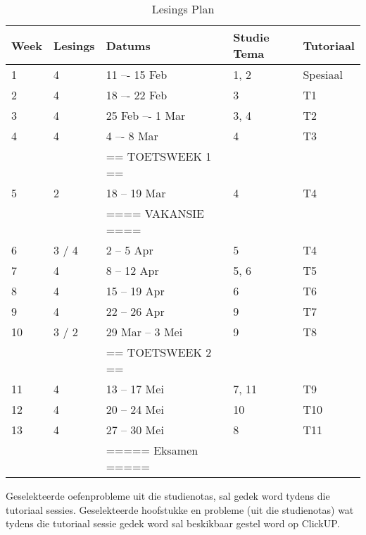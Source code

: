         \begin{table}[!h]
            \begin{center}
             \begin{tabular}{|l|l|l|l|l|}
                 \hline
                 {\bf Week} & {\bf Lesings} & {\bf Datums} & {\bf Studie Tema} & {\bf Tutoriaal} \\
                 \hline
                 1  & 4     & 11 –- 15 Feb     & 1, 2  & Spesiaal \\
                 2  & 4     & 18 –- 22 Feb     & 3     & T1 \\
                 3  & 4     & 25 Feb –- 1 Mar  & 3, 4  & T2 \\
                 4  & 4     & 4 –- 8 Mar       & 4     & T3 \\
                    &       & == TOETSWEEK 1 == &       & \\
                 5  & 2     & 18 -- 19 Mar     & 4     & T4 \\
                    &       & ==== VAKANSIE ==== &       & \\
                 6  & 3 / 4 & 2 -- 5 Apr       & 5     & T4 \\
                 7  & 4     & 8 -- 12 Apr      & 5, 6  & T5 \\
                 8  & 4     & 15 -- 19 Apr     & 6     & T6 \\
                 9  & 4     & 22 -- 26 Apr     & 9     & T7 \\
                 10 & 3 / 2 & 29 Mar -- 3 Mei  & 9     & T8 \\
                    &       & == TOETSWEEK 2 == &       & \\
                 11 & 4     & 13 -- 17 Mei     & 7, 11 & T9 \\
                 12 & 4     & 20 -- 24 Mei     & 10    & T10 \\
                 13 & 4     & 27 -- 30 Mei     & 8     & T11 \\
                    &       & ===== Eksamen ===== &       & \\
                 \hline
             \end{tabular}
             \caption{Lesings Plan}
            \end{center}
        \end{table}
        
	Geselekteerde oefenprobleme uit die studienotas, sal gedek word tydens
	die tutoriaal sessies.  Geselekteerde hoofstukke en probleme (uit die 
	studienotas) wat tydens die tutoriaal sessie gedek word sal beskikbaar
	gestel word op ClickUP.
        
